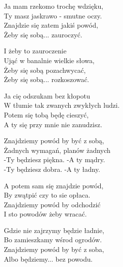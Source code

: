 \begin{text}
    Ja mam rzekomo trochę wdzięku,\\
    Ty masz jaskrawo - smutne oczy.\\
    Znajdzie się zatem jakiś powód,\\
    Żeby się sobą... zauroczyć.

    I żeby to zauroczenie\\
    Ująć w banalnie wielkie słowa,\\
    Żeby się sobą pozachwycać,\\
    Żeby się sobą... rozkoszować.

    Ja cię odszukam bez kłopotu\\
    W tłumie tak zwanych zwykłych ludzi.\\
    Potem się tobą będę cieszyć,\\
    A ty się przy mnie nie zanudzisz.

    Znajdziemy powód by być z sobą,\\
    Żadnych wymagań, planów żadnych\\
    -Ty będziesz piękna. -A ty mądry.\\
    -Ty będziesz dobra. -A ty ładny.

    A potem sam się znajdzie powód,\\
    By zwątpić czy to sie opłaca.\\
    Znajdziemy powód by odchodzić\\
    I sto powodów żeby wracać.

    Gdzie nie zajrzymy będzie ładnie,\\
    Bo zamieszkamy wśrod ogrodów.\\
    Znajdziemy powód by być z soba,\\
    Albo będziemy... bez powodu.
\end{text}
\begin{chord}

\end{chord}